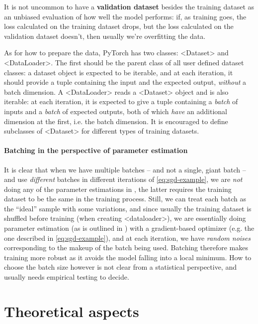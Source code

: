 \documentclass[hyperref, a4paper, 12pt]{report}
\newcommand*{\concept}[1]{{\textbf{#1}}}
\def\texttt#1{<#1>}%
\newcommand{\shortcode}[1]{\texttt{#1}}
\begin{document}
It is not uncommon to have a \concept{validation dataset} besides the training dataset
as an unbiased evaluation of how well the model performs:
if, as training goes, the loss calculated on the training dataset drops,
but the loss calculated on the validation dataset doesn't,
then usually we're overfitting the data.

As for how to prepare the data,
PyTorch has two classes: \shortcode{Dataset} and \shortcode{DataLoader}.
The first should be the parent class of all user defined dataset classes:
a dataset object is expected to be iterable,
and at each iteration, it should provide a tuple
containing the input and the expected output,
\emph{without} a batch dimension.
A \shortcode{DataLoader} reads a \shortcode{Dataset} object and is also iterable:
at each iteration, it is expected to give a tuple 
containing a \emph{batch} of inputs and a \emph{batch} of expected outputs,
both of which \emph{have} an additional dimension at the first, i.e. the batch dimension.
It is encouraged to define subclasses of \shortcode{Dataset}
for different types of training datasets.

\paragraph*{Batching in the perspective of parameter estimation}
It is clear that when we have multiple batches -- and not a single, giant batch -- and use \emph{different} batches in different iterations of \eqref{eq:sgd-example},
we are \emph{not} doing any of the parameter estimations in ,
the latter requires the training dataset to be the same in the training process.
Still, we can treat each batch as the ``ideal'' sample with some variations,
and since usually the training dataset is shuffled before training (when creating \shortcode{dataloader}),
we are essentially doing parameter estimation (as is outlined in )
with a gradient-based optimizer (e.g. the one described in \eqref{eq:sgd-example}),
and at each iteration, we have \emph{random noises} corresponding to the makeup of the batch being used.
Batching therefore makes training more robust as it avoids the model falling into a local minimum.
How to choose the batch size however is not clear from a statistical perspective, and usually needs empirical testing to decide.

\section{Theoretical aspects}\label{sec:theoretical-aspects}
\end{document}
